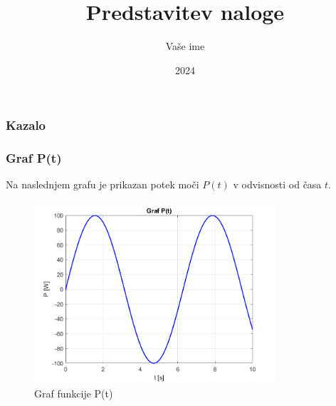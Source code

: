 \documentclass{beamer}
\title{Predstavitev naloge}
\author{Vaše ime}
\date{2024}
\begin{document}
\frame{\titlepage}

\begin{frame}
\frametitle{Kazalo}
    \tableofcontents
\end{frame}

\begin{frame}
\frametitle{Graf P(t)}
    Na naslednjem grafu je prikazan potek moči $P(t)$ v odvisnosti od časa $t$.
    \begin{figure}
        \centering
        \includegraphics[width=0.8\textwidth]{graf.png} %
        \caption{Graf funkcije P(t)}
    \end{figure}
\end{frame}
\end{document}
